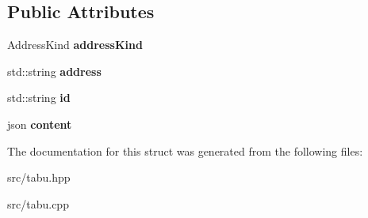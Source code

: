 \subsection*{Public Attributes}
\begin{DoxyCompactItemize}
\item 
\mbox{\label{structMessage_a68f6134fbd3f9ee60933b795736ee48c}} 
Address\+Kind {\bfseries address\+Kind}
\item 
\mbox{\label{structMessage_af327f99cff6a93dd35c9205b026c5286}} 
std\+::string {\bfseries address}
\item 
\mbox{\label{structMessage_a5883e8b2fa30ad34978871f392ba36c3}} 
std\+::string {\bfseries id}
\item 
\mbox{\label{structMessage_a5e31a45b322f0d84a62a87a88243d728}} 
json {\bfseries content}
\end{DoxyCompactItemize}


The documentation for this struct was generated from the following files\+:\begin{DoxyCompactItemize}
\item 
src/tabu.\+hpp\item 
src/tabu.\+cpp\end{DoxyCompactItemize}
